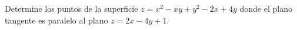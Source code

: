 Determine los puntos de la superficie $z = x^2 - xy + y^2 - 2x + 4y$ donde el plano tangente es paralelo al plano $z = 2x - 4y + 1$.
